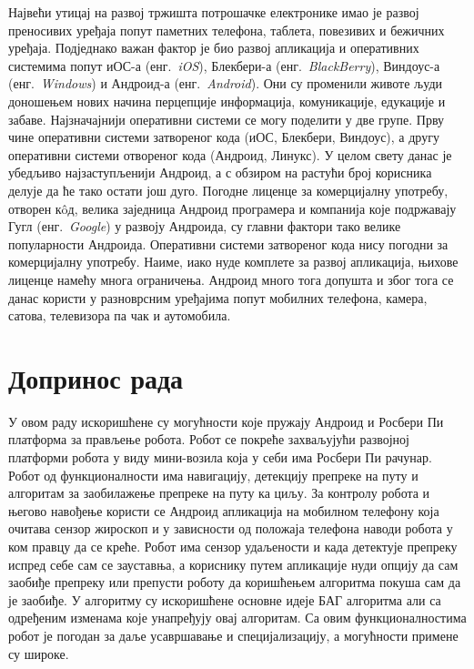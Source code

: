 \documentclass[12pt,oneside]{memoir}
\theoremstyle{remark}
\begin{document}
Највећи утицај на развој тржишта потрошачке електронике имао је развој преносивих уређаја попут паметних телефона, таблета, повезивих и бежичних уређаја. Подједнако важан фактор је био развој апликација и оперативних системима попут иОС-а (енг.~{\em iOS}), Блекбери-а (енг.~{\em BlackBerry}), Виндоус-а (енг.~{\em Windows}) и Андроид-а (енг.~{\em Android}). Они су променили животе људи доношењем нових начина перцепције информација, комуникације, едукације и забаве. Најзначајнији оперативни системи се могу поделити у две групе. Прву чине оперативни системи затвореног кода (иОС, Блекбери, Виндоус), а другу оперативни системи отвореног кода (Андроид, Линукс). У целом свету данас је убедљиво најзаступљенији Андроид, а с обзиром на растући број корисника делује да ће тако остати још дуго. Погодне лиценце за комерцијалну употребу, отворен к\^{o}д, велика заједница Андроид програмера и компанија које подржавају Гугл (енг.~{\em Google}) у развоју Андроида, су главни фактори тако велике популарности Андроида. Оперативни системи затвореног кода нису погодни за комерцијалну употребу. Наиме, иако нуде комплете за развој апликација, њихове лиценце намећу многа ограничења. Андроид много тога допушта  и због тога се данас користи у разноврсним уређајима попут мобилних телефона, камера, сатова, телевизора па чак и аутомобила.

\section{Допринос рада}
У овом раду искоришћене су могућности које пружају Андроид и Росбери Пи платформа за прављење робота. Робот се покреће захваљујући развојној платформи робота у виду мини-возила која у себи има Росбери Пи рачунар. Робот од функционалности има навигацију, детекцију препреке на путу и алгоритам за заобилажење препреке на путу ка циљу. За контролу робота и његово навођење користи се Андроид апликација на мобилном телефону која очитава сензор жироскоп и у зависности од положаја телефона наводи робота у ком правцу да се креће. Робот има сензор удаљености и када детектује препреку испред себе сам се зауставња, а кориснику путем апликације нуди опцију да сам заобиђе препреку или препусти роботу да коришћењем алгоритма покуша сам да је заобиђе. У алгоритму су искоришћене основне идеје БАГ алгоритма али са одређеним изменама које унапређују овај алгоритам. Са овим функционалностима робот је погодан за даље усавршавање и специјализацију, а могућности примене су широке. 
\end{document}
